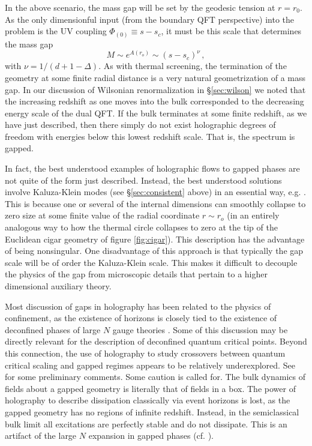 \documentclass[10pt, oneside]{book}
\def\be{\begin{equation}}
\def\ee{\end{equation}}
\begin{document}
\begin{doublespace}
In the above scenario, the mass gap will be set by the geodesic tension at $r=r_0$. As the only dimensionful input (from the boundary QFT perspective) into the problem is the UV coupling $\Phi_{(0)} \equiv s-s_c$, it must be this scale that determines the mass gap
\be
M \sim e^{A(r_o)} \sim (s-s_c)^\nu\,,
\ee
with $\nu = 1/(d + 1 - \Delta)$. As with thermal screening, the termination of the geometry at some finite radial distance is a very natural geometrization of a mass gap. In our discussion of Wilsonian renormalization in \S\ref{sec:wilson} we noted that the increasing redshift as one moves into the bulk corresponded to the decreasing energy scale of the dual QFT. If the bulk terminates at some finite redshift, as we have just described, then there simply do not exist holographic degrees of freedom with energies below this lowest redshift scale. That is, the spectrum is gapped.

In fact, the best understood examples of holographic flows to gapped phases are not quite of the form just described. Instead, the best understood solutions involve Kaluza-Klein modes (see \S\ref{sec:consistent} above) in an essential way, e.g. \cite{Witten:1998zw,Klebanov:2000hb,Maldacena:2000yy}. This is because one or several of the internal dimensions can smoothly collapse to zero size at some finite value of the radial coordinate $r \sim r_o$ (in an entirely analogous way to how the thermal circle collapses to zero at the tip of the Euclidean cigar geometry of figure \ref{fig:cigar}). This description has the advantage of being nonsingular. One disadvantage of this approach is that typically the gap scale will be of order the Kaluza-Klein scale. This makes it difficult to decouple the physics of the gap from microscopic details that pertain to a higher dimensional auxiliary theory.

Most discussion of gaps in holography has been related to the physics of confinement, as the existence of horizons is closely tied to the existence of deconfined phases of large $N$ gauge theories \cite{Witten:1998zw}. Some of this discussion may be directly relevant for the description of deconfined quantum critical points. Beyond this connection, the use of holography to study crossovers between quantum critical scaling and gapped regimes appears to be relatively underexplored. See \cite{Myers:2016wsu} for some preliminary comments. Some caution is called for. The bulk dynamics of fields about a gapped geometry is literally that of fields in a box. The power of holography to describe dissipation classically via event horizons is lost, as the gapped geometry has no regions of infinite redshift. Instead, in the semiclassical bulk limit all excitations are perfectly stable and do not dissipate. This is an artifact of the large $N$ expansion in gapped phases (cf. \cite{'tHooft:1973jz}).


\end{doublespace}
\end{document}

